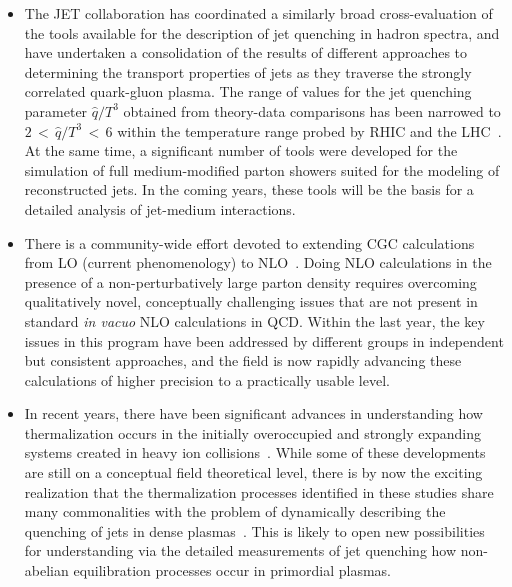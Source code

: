 \begin{itemize}
\item 
The JET collaboration\cite{JET} has coordinated a similarly broad cross-evaluation of the tools available
for the description of jet quenching in hadron spectra,
and have undertaken a
consolidation of the results of different approaches to 
determining the transport properties of jets as they traverse the strongly correlated quark-gluon plasma.
The range of values for the jet quenching parameter $\hat{q}/T^3$ obtained from  
theory-data comparisons has been narrowed to
$2{\,<\,}\hat{q}/T^3{\,<\,}6$ within the temperature range probed by RHIC and the LHC~\cite{Burke:2013yra}.
At the same time, a significant number of 
tools were developed for the simulation of full medium-modified parton showers suited for the modeling
of reconstructed jets. In the coming years, these tools will be the basis for a detailed analysis of jet-medium
interactions.  

\item 
There is a community-wide effort devoted to extending CGC calculations from LO
 (current phenomenology) to 
NLO~\cite{Balitsky:2008zza,Chirilli:2011km,Stasto:2013cha,Beuf:2014uia,Kang:2014lha}.
Doing NLO calculations in the presence of a non-perturbatively large parton density requires overcoming
qualitatively novel, conceptually challenging issues that are not present in standard {\em in vacuo} NLO calculations in QCD. Within the last
year, the key issues in this program have been addressed by different groups in independent but consistent
approaches, and the field is now rapidly  advancing these calculations of higher precision to a practically
usable level. 

\item 
In recent years, there have been significant advances in understanding how thermalization occurs in the
initially overoccupied and strongly expanding systems created in heavy ion 
collisions~\cite{Berges:2013eia,Gelis:2013rba,Kurkela:2014tea}. While some of these
developments are still on a conceptual field theoretical level, there is by now the exciting realization that the thermalization
processes identified in these studies share many commonalities with the problem of dynamically describing the
quenching of jets in dense plasmas~\cite{Blaizot:2013hx,Kurkela:2014tla}. 
This is likely to open new possibilities for understanding via the detailed measurements
of jet quenching how non-abelian equilibration processes occur in primordial plasmas. 


\end{itemize}
